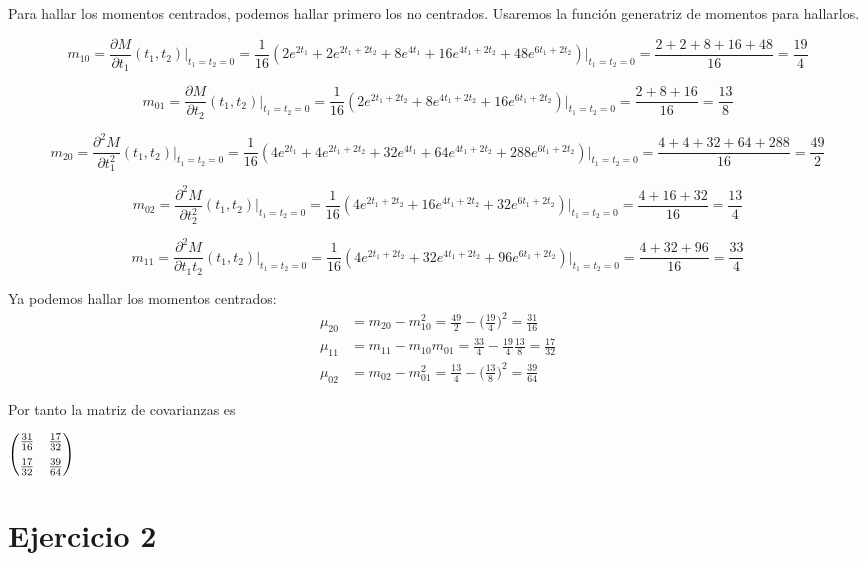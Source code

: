 \documentclass[tikz]{article}
\begin{document}
Para hallar los momentos centrados, podemos hallar primero los no
centrados. Usaremos la función generatriz de momentos para hallarlos.

\[m_{10} = \frac{\partial M}{\partial t_1}(t_1,t_2)\Big|_{t_1=t_2=0} =
  \frac{1}{16}(2e^{2t_1} + 2e^{2t_1+2t_2} + 8e^{4t_1} +
  16e^{4t_1+2t_2} + 48e^{6t_1+2t_2})\Big|_{t_1=t_2=0} =
  \frac{2+2+8+16+48}{16} = \frac{19}{4}\]

\[m_{01} = \frac{\partial M}{\partial t_2}(t_1,t_2)\Big|_{t_1=t_2=0} =
  \frac{1}{16}(2e^{2t_1+2t_2} + 8e^{4t_1+2t_2} +
  16e^{6t_1+2t_2})\Big|_{t_1=t_2=0} = \frac{2+8+16}{16} = \frac{13}{8}\]

\[m_{20} = \frac{\partial^2 M}{\partial
    t_1^2}(t_1,t_2)\Big|_{t_1=t_2=0} = \frac{1}{16}(4e^{2t_1} +
  4e^{2t_1+2t_2} + 32e^{4t_1} + 64e^{4t_1+2t_2} +
  288e^{6t_1+2t_2})\Big|_{t_1=t_2=0} = \frac{4+4+32+64+288}{16} =
  \frac{49}{2}\]

\[m_{02} = \frac{\partial^2 M}{\partial
    t_2^2}(t_1,t_2)\Big|_{t_1=t_2=0} = \frac{1}{16}(4e^{2t_1+2t_2} +
  16e^{4t_1+2t_2} + 32e^{6t_1+2t_2})\Big|_{t_1=t_2=0} =
  \frac{4+16+32}{16} = \frac{13}{4}\]

\[m_{11} = \frac{\partial^2 M}{\partial
    t_1t_2}(t_1,t_2)\Big|_{t_1=t_2=0} = \frac{1}{16}(4e^{2t_1+2t_2} +
  32e^{4t_1+2t_2} + 96e^{6t_1+2t_2})\Big|_{t_1=t_2=0} =
  \frac{4+32+96}{16} = \frac{33}{4}\]

\vspace{3mm}

Ya podemos hallar los momentos centrados:
\begin{align*}
  \mu_{20}&=m_{20}-m_{10}^2 = \frac{49}{2} - \Big(\frac{19}{4}\Big)^2 = \frac{31}{16} \\
  \mu_{11}&=m_{11}-m_{10}m_{01} = \frac{33}{4} - \frac{19}{4}\frac{13}{8} = \frac{17}{32} \\
  \mu_{02}&=m_{02}-m_{01}^2 = \frac{13}{4} - \Big(\frac{13}{8}\Big)^2 = \frac{39}{64}
\end{align*}

Por tanto la matriz de covarianzas es

\begin{center}
  $
  \begin{pmatrix}
    \frac{31}{16} & \frac{17}{32} \vspace{2mm}\\
    \frac{17}{32} & \frac{39}{64} 
  \end{pmatrix}
  $
\end{center}

\section*{Ejercicio 2}
\end{document}
